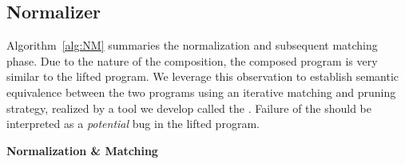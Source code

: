 \subsection{Normalizer}\label{sec:normalizer}

Algorithm~\ref{alg:NM} summaries the normalization and subsequent matching 
phase.
Due to the nature of the composition, the composed program  is 
very similar to the lifted program. We leverage this observation to establish 
semantic equivalence between the two 
programs using an iterative matching and pruning strategy, realized by a tool 
we develop called the \matcher. Failure of the  
\matcher should be interpreted as a \emph{potential} bug in the lifted program. 
\newcommand\mycommfont[1]{\footnotesize\textcolor{blue}{#1}}
\begin{algorithm}


    \BlankLine
    
    \caption{\textbf{Normalization \& Matching}}\label{alg:NM}
\end{algorithm}



